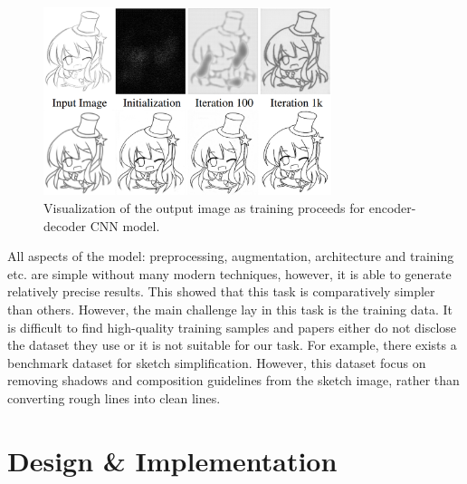 \begin{figure}
    \centering
    \includegraphics[width=0.75\textwidth]{images/sketch/learning2simp.png}
    \caption{Visualization of the output image as training proceeds for encoder-decoder CNN model.} 
    \label{fig:learning2simp}
\end{figure}

All aspects of the model: preprocessing, augmentation, architecture and training etc. are simple without many modern techniques, however, it is able to generate relatively precise results. This showed that this task is comparatively simpler than others. However, the main challenge lay in this task is the training data. It is difficult to find high-quality training samples and papers either do not disclose the dataset they use or it is not suitable for our task. For example, there exists a benchmark dataset for sketch simplification\cite{yanBenchmarkRoughSketch2020}. However, this dataset focus on removing shadows and composition guidelines from the sketch image, rather than converting rough lines into clean lines.

\section{Design \& Implementation}
